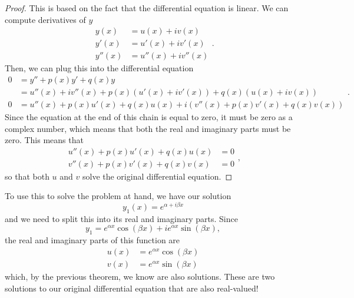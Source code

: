 \documentclass{ximera}
\begin{document}
\begin{proof}
    This is based on the fact that the differential equation is linear. We can compute derivatives of $y$
    \begin{equation*}
        \begin{split}
            y(x)&= u(x) + iv(x) \\
            y'(x) &= u'(x) + iv'(x) \\
            y''(x) &= u''(x) + iv''(x)
        \end{split}.
    \end{equation*}
    Then, we can plug this into the differential equation
    \begin{equation*}
        \begin{split}
            0 &= y'' + p(x)y' + q(x) y \\
            &= u''(x) + iv''(x) + p(x)(u'(x) + iv'(x)) + q(x) (u(x) + iv(x)) \\
            0&= u''(x) + p(x)u'(x) + q(x)u(x) + i(v''(x) + p(x)v'(x) + q(x)v(x)) 
        \end{split}.
    \end{equation*}
    Since the equation at the end of this chain is equal to zero, it must be zero as a complex number, which means that both the real and imaginary parts must be zero. This means that
    \begin{equation*}
        \begin{split}
            u''(x) + p(x)u'(x) + q(x)u(x) &= 0 \\
            v''(x) + p(x)v'(x) + q(x)v(x) &= 0
        \end{split},
    \end{equation*}
    so that both $u$ and $v$ solve the original differential equation.
\end{proof}

To use this to solve the problem at hand, we have our solution
\begin{equation*}
    y_1(x) = e^{\alpha + i\beta x}
\end{equation*}
and we need to split this into its real and imaginary parts. Since
\begin{equation*}
    y_1  = e^{\alpha x} \cos (\beta x) + i e^{\alpha x} \sin (\beta x),
\end{equation*}
the real and imaginary parts of this function are
\begin{equation*}
    \begin{split}
        u(x) &= e^{\alpha x} \cos (\beta x) \\
        v(x) &= e^{\alpha x} \sin (\beta x)
    \end{split}
\end{equation*}
which, by the previous theorem, we know are also solutions. These are two solutions to our original differential equation that are also real-valued!
\end{document}
